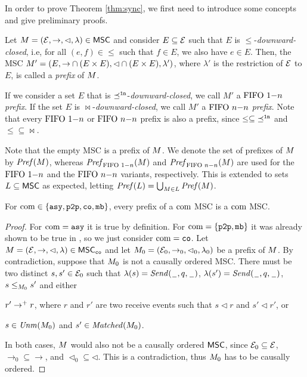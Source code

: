 In order to prove Theorem \ref{thm:sync}, we first need to introduce some concepts and give preliminary proofs. 

\begin{definition}[Prefix]
	Let $M = (\mathcal{E},\to,\lhd,\lambda) \in \mathsf{MSC}$ and consider
	$E \subseteq \mathcal{E}$ such that $E$ is ${\le}$-\emph{downward-closed}, i.e,
	for all $(e,f) \in {\le}$ such that $f \in E$, we also have $e \in E$.
	Then, the MSC $M' = (E,{\to} \cap (E \times E),{\lhd} \cap (E \times E),\lambda')$,
	where $\lambda'$ is the restriction of $\mathcal{E}$ to $E$, is called a \emph{prefix}
	of $M$. 	
\end{definition}

If we consider a set $E$ that is ${\preceq^{\mathtt{1n}}}$-\emph{downward-closed}, we call $M'$ a \emph{$\text{FIFO } 1\mathsf{-}n$ prefix}.
If the set $E$ is ${\bowtie}$-\emph{downward-closed}, we call $M'$ a \emph{$\text{FIFO } n\mathsf{-}n$ prefix}. Note that every $\text{FIFO } 1\mathsf{-}n$ or $\text{FIFO } n\mathsf{-}n$ prefix is also a prefix, since $\le \subseteq {\preceq^{\ensuremath{\mathtt{1n}}}}$ and $\le \subseteq {\bowtie}$.

Note that the empty MSC is a prefix of $M$.
We denote the set of prefixes of $M$ by $\mathit{Pref}(M)$, whereas $\mathit{Pref}_{\text{FIFO } 1\mathsf{-}n}(M)$ and $\mathit{Pref}_{\text{FIFO } n\mathsf{-}n}(M)$ are used for the $\text{FIFO } 1\mathsf{-}n$ and the $\text{FIFO } n\mathsf{-}n$ variants, respectively.
This is extended to sets $L \subseteq \mathsf{MSC}$ as expected, letting
$\mathit{Pref}(L) = \bigcup_{M \in L} \mathit{Pref}(M)$.

\begin{proposition}
	\label{prop:prefixes}
	For $\textup{com} \in \{\mathtt{asy}, \mathtt{p2p}, \mathtt{co}, \mathtt{mb}\}$, every prefix of a $\textup{com}$ MSC is a $\textup{com}$ MSC.
\end{proposition}
\begin{proof}
    For $\textup{com} = \mathtt{asy}$ it is true by definition. For $\textup{com} = \{\mathtt{p2p}, \mathtt{mb}\}$ it was already shown to be true in \cite{BolligFG21}, so we just consider $\textup{com} = \mathtt{co}$. Let $M = (\mathcal{E}, \to, \lhd, \lambda) \in \mathsf{MSC}_{\mathtt{co}}$ and let $M_0 =
    (\mathcal{E}_0, \to_0, \lhd_0, \lambda_0)$ be a prefix of $M$. By contradiction, suppose that $M_0$ is not a	causally ordered MSC. There must be two distinct $s,s' \in \mathcal{E}_0$ such that $\lambda(s)={\mathit{Send}(\hspace{0.1em}\underline{\hspace{0.5em}}\hspace{0.1em},q,\hspace{0.1em}\underline{\hspace{0.5em}}\hspace{0.1em})}$, $\lambda(s')={\mathit{Send}(\hspace{0.1em}\underline{\hspace{0.5em}}\hspace{0.1em},q,\hspace{0.1em}\underline{\hspace{0.5em}}\hspace{0.1em})}$, $s \le_{M_0} s'$ and either
    \begin{enumerate*}[label={(\roman*)}]
        \item $r' \to^+ r$, where $r$ and $r'$ are two receive events such that $s \lhd r$ and $s' \lhd r'$, or
        \item $s \in \mathit{Unm}(M_0)$ and $s' \in \mathit{Matched}(M_0)$.
    \end{enumerate*}
    In both cases, $M$ would also not be a causally ordered $\mathsf{MSC}$, since $\mathcal{E}_0 \subseteq \mathcal{E}$, ${\rightarrow_0} \subseteq {\rightarrow}$, and ${\lhd_0} \subseteq {\lhd}$. This is a contradiction, thus $M_0$ has to be causally ordered.
\end{proof}

